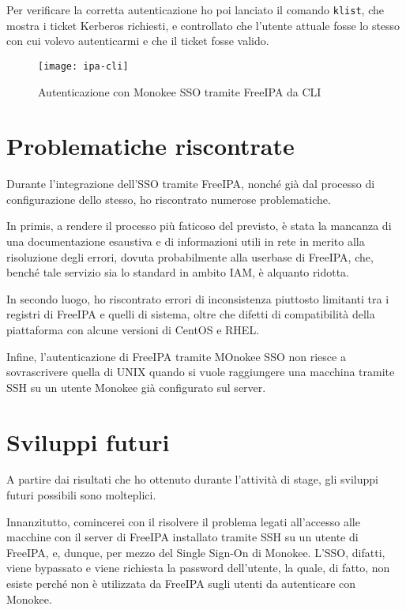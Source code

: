 Per verificare la corretta autenticazione ho poi lanciato il comando \texttt{klist}, che mostra i ticket Kerberos richiesti, e controllato che l'utente attuale fosse lo stesso con cui volevo autenticarmi e che il ticket fosse valido.  

\begin{figure}[!h] 
    \centering 
    \texttt{[image: ipa-cli]} 
    \caption{Autenticazione con Monokee SSO tramite FreeIPA da CLI}
    \label{fig:ipa-cli}
\end{figure}


\section{Problematiche riscontrate}

Durante l'integrazione dell'SSO tramite FreeIPA, nonché già dal processo di configurazione dello stesso, ho riscontrato numerose problematiche.

In primis, a rendere il processo più faticoso del previsto, è stata la mancanza di una  documentazione esaustiva e di informazioni utili in rete in merito alla risoluzione degli errori, dovuta probabilmente alla userbase di FreeIPA, che, benché tale servizio sia lo standard in ambito IAM, è alquanto ridotta.

In secondo luogo, ho riscontrato errori di inconsistenza piuttosto limitanti tra i registri di FreeIPA e quelli di sistema, oltre che difetti di compatibilità della piattaforma con alcune versioni di CentOS e RHEL.

Infine, l'autenticazione di FreeIPA tramite MOnokee SSO non riesce a sovrascrivere quella di UNIX quando si vuole raggiungere una macchina tramite SSH su un utente Monokee già configurato sul server. 

\section{Sviluppi futuri}
A partire dai risultati che ho ottenuto durante l'attività di stage, gli sviluppi futuri possibili sono molteplici.

Innanzitutto, comincerei con il risolvere il problema legati all'accesso alle macchine con il server di FreeIPA installato tramite SSH su un utente di FreeIPA, e, dunque, per mezzo del Single Sign-On di Monokee. L'SSO, difatti, viene bypassato e viene richiesta la password dell'utente, la quale, di fatto, non esiste perché non è utilizzata da FreeIPA sugli utenti da autenticare con Monokee. 

